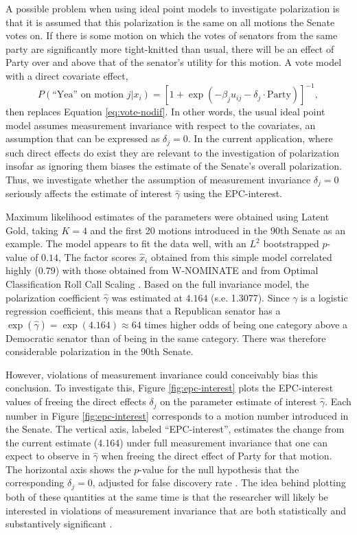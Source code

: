 \documentclass[12pt]{article}
\begin{document}
A possible problem when using ideal point models to investigate polarization is that it is assumed that this polarization is the same on all motions the Senate votes on. If there is some motion on which the votes of senators from the same party are significantly more tight-knitted than usual, there will be an effect of Party over and above that of the senator's utility for this motion. A vote model with a direct covariate effect,
\begin{equation}
		P(\text{``Yea'' on motion } j | x_i) = [1 + \exp(-\beta_j u_{ij} - \delta_j \cdot\text{Party})]^{-1},
	\label{eq:vote-dif}
\end{equation}
then replaces Equation \ref{eq:vote-nodif}. In other words, the usual ideal point model assumes measurement invariance with respect to the covariates, an assumption that can be expressed as $\delta_j=0$. In the current application, where such direct effects do exist they are relevant to the investigation of polarization insofar as ignoring them biases the estimate of the Senate's overall polarization. Thus, we investigate whether the assumption of measurement invariance $\delta_j=0$  seriously affects the estimate of interest $\hat{\gamma}$ using the EPC-interest.

Maximum likelihood estimates of the parameters were obtained using Latent Gold, taking $K=4$ and the first 20 motions introduced in the 90th Senate as an example. The model appears to fit the data well, with an $L^2$ bootstrapped $p$-value of $0.14$, The factor scores $\hat{x}_i$ obtained from this simple model correlated highly (0.79) with those obtained from W-NOMINATE \citep{poole2008scaling} and from Optimal Classification Roll Call Scaling \citep[0.81;][]{poole2012oc}.
Based on the full invariance model, the polarization coefficient $\hat{\gamma}$ was estimated at $4.164$ (s.e. 1.3077). Since $\gamma$ is a logistic regression coefficient, this means that a Republican senator has a $\exp(\hat{\gamma})=\exp(4.164)\approx64$ times higher odds of being one category above a Democratic senator than of being in the same category. There was therefore considerable polarization in the 90th Senate. 

However, violations of measurement invariance could conceivably bias this conclusion. To investigate this, Figure \ref{fig:epc-interest} plots the EPC-interest values of freeing the direct effects $\delta_j$ on the parameter estimate of interest $\hat{\gamma}$. Each number in Figure \ref{fig:epc-interest} corresponds to a motion number introduced in the Senate. The vertical axis, labeled ``EPC-interest'', estimates the change from the current estimate (4.164) under full measurement invariance that one can expect to observe in $\hat{\gamma}$ when freeing the direct effect of Party for that motion. 
The horizontal axis shows the $p$-value for the null hypothesis that the corresponding $\delta_j = 0$, adjusted for false discovery rate \citep{benjamini1995controlling}. The idea behind plotting both of these quantities at the same time is that the researcher will likely be interested in violations of measurement invariance that are both statistically and substantively significant \citep{saris2009testing}.
\end{document}
